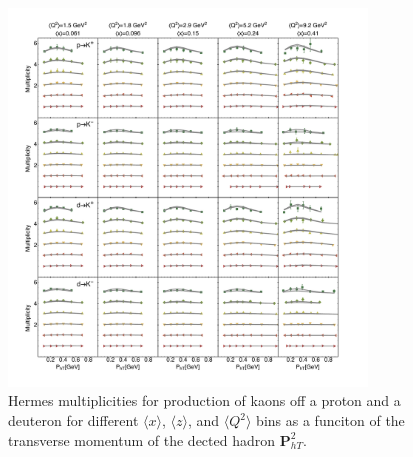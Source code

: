 \documentclass[aps,preprintnumbers,showpacs,nofootinbib,superscriptaddress,floatfix]{revtex4}
\begin{document}
\begin{figure}[h!]
\begin{center}
\includegraphics[width=0.85\textwidth]{plots/Hermes/Hermes_Kaons_SCIplot_flINDEP.pdf}
\end{center}
\caption{Hermes multiplicities for production of kaons off a proton and a deuteron for different $\langle x \rangle$, $\langle z \rangle$, and $\langle Q^2 \rangle$ bins as a funciton of the transverse momentum of the dected hadron ${\bm P}_{hT}^ 2$.} 
\label{f:H_kaons}
\end{figure}
\end{document}
